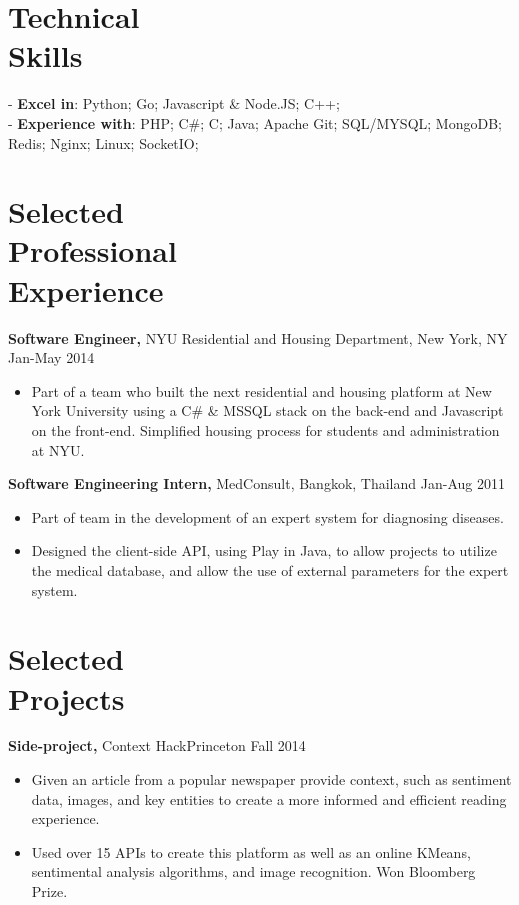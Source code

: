 \documentclass[margin]{res}
\begin{document}
 
\begin{resume}
 
 \section{Technical \\ Skills}
- {\bf Excel in}: Python; Go; Javascript \& Node.JS; C++; \\
- {\bf Experience with}: PHP;  C\#; C; Java; Apache Git; SQL/MYSQL; MongoDB; Redis; Nginx; Linux; SocketIO; 
 
\section{Selected \\ Professional \\ Experience}

{\bf Software Engineer,} NYU Residential and Housing Department, New York, NY \hfill Jan-May 2014
 \begin{itemize} \itemsep -2pt
 \item Part of a team who built the next residential and housing platform at New York University using a C\# \& MSSQL stack on the back-end and Javascript on the front-end. Simplified housing process for students and administration at NYU.
 \end{itemize}

 {\bf Software Engineering Intern,} MedConsult, Bangkok, Thailand \hfill Jan-Aug 2011
 \begin{itemize} \itemsep -2pt
 \item Part of team in the development of an expert system for diagnosing diseases.
 \item Designed the client-side API, using Play in Java, to allow projects to utilize the medical database, and allow the use of external parameters for the expert system.
 \end{itemize}
 
\section{Selected \\ Projects}
{\bf Side-project,} Context \hfill HackPrinceton Fall 2014
 \begin{itemize} \itemsep -2pt 
 \item Given an article from a popular newspaper provide context, such as sentiment data, images, and key entities to create a more informed and efficient reading experience.
 \item Used over 15 APIs to create this platform as well as an online KMeans, sentimental analysis algorithms, and image recognition. Won Bloomberg Prize.
 \end{itemize}
 

\end{resume}
\end{document}
